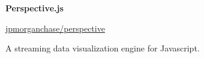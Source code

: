 
{\large\textbf{Perspective.js}}

\href{http://github.com/jpmorganchase/perspective}{jpmorganchase/perspective}

A streaming data visualization engine for Javascript.

